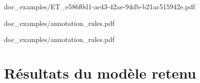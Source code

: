 \documentclass{report}
\begin{document}
        
                    {doc_examples/ET_e586f0d1-ae43-42ae-94db-b21ac515942e.pdf}

        
        {doc_examples/annotation_rules.pdf}
        
        {doc_examples/annotation_rules.pdf}

        



\chapter{Résultats du modèle retenu}

    \begin{tiny}
    \begin{spacing}{1.0}
    
    \end{spacing}
\end{tiny}
    
\end{document}
